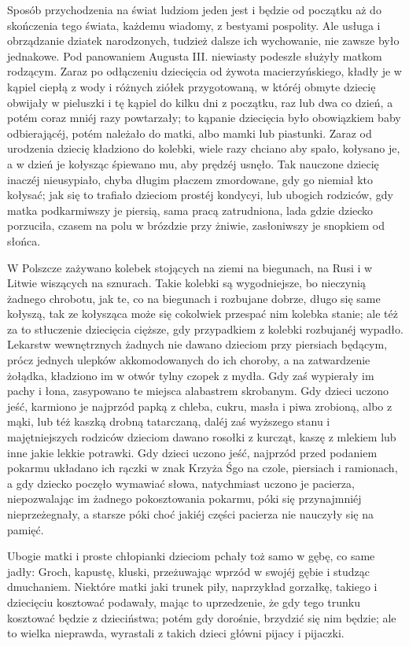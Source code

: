\documentclass{book}
\begin{document}
Sposób przychodzenia na świat ludziom jeden jest i będzie od początku aż do skończenia tego świata, każdemu wiadomy, z bestyami pospolity. Ale usługa i obrządzanie dziatek narodzonych, tudzież dalsze ich wychowanie, nie zawsze było jednakowe. Pod panowaniem Augusta III. niewiasty podeszłe służyły matkom rodzącym. Zaraz po odłączeniu dziecięcia od żywota macierzyńskiego, kładły je w kąpiel ciepłą z wody i różnych ziółek przygotowaną, w któréj obmyte dziecię obwijały w pieluszki i tę kąpiel do kilku dni z początku, raz lub dwa co dzień, a potém coraz mniéj razy powtarzały; to kąpanie dziecięcia było obowiązkiem baby odbierającéj, potém należało do matki, albo mamki lub piastunki. Zaraz od urodzenia dziecię kładziono do kolebki, wiele razy chciano aby spało, kołysano je, a w dzień je kołysząc śpiewano mu, aby prędzéj usnęło. Tak nauczone dziecię inaczéj nieusypiało, chyba długim płaczem zmordowane, gdy go niemiał kto kołysać; jak się to trafiało dzieciom prostéj kondycyi, lub ubogich rodziców, gdy matka podkarmiwszy je piersią, sama pracą zatrudniona, lada gdzie dziecko porzuciła, czasem na polu w brózdzie przy żniwie, zasłoniwszy je snopkiem od słońca.

W Polszcze zażywano kolebek stojących na ziemi na biegunach, na Rusi i w Litwie wiszących na sznurach. Takie kolebki są wygodniejsze, bo nieczynią żadnego chrobotu, jak te, co na biegunach i rozbujane dobrze, długo się same kołyszą, tak ze kołysząca może się cokolwiek przespać nim kolebka stanie; ale téż za to stłuczenie dziecięcia cięższe, gdy przypadkiem z kolebki rozbujanéj wypadło. Lekarstw wewnętrznych żadnych nie dawano dzieciom przy piersiach będącym, prócz jednych ulepków akkomodowanych do ich choroby, a na zatwardzenie żołądka, kładziono im w otwór tylny czopek z mydła. Gdy zaś wypierały im pachy i łona, zasypowano te miejsca alabastrem skrobanym. Gdy dzieci uczono jeść, karmiono je najprzód papką z chleba, cukru, masła i piwa zrobioną, albo z mąki, lub téż kaszką drobną tatarczaną, daléj zaś wyższego stanu i majętniejszych rodziców dzieciom dawano rosołki z kurcząt, kaszę z mlekiem lub inne jakie lekkie potrawki. Gdy dzieci uczono jeść, najprzód przed podaniem pokarmu układano ich rączki w znak Krzyża Śgo na czole, piersiach i ramionach, a gdy dziecko poczęło wymawiać słowa, natychmiast uczono je pacierza, niepozwalając im żadnego pokosztowania pokarmu, póki się przynajmniéj nieprzeżegnały, a starsze póki choć jakiéj części pacierza nie nauczyły się na pamięć.

Ubogie matki i proste chłopianki dzieciom pchały toż samo w gębę, co same jadły: Groch, kapustę, kluski, przeżuwając wprzód w swojéj gębie i studząc dmuchaniem. Niektóre matki jaki trunek piły, naprzykład gorzałkę, takiego i dziecięciu kosztować podawały, mając to uprzedzenie, że gdy tego trunku kosztować będzie z dzieciństwa; potém gdy dorośnie, brzydzić się nim będzie; ale to wielka nieprawda, wyrastali z takich dzieci główni pijacy i pijaczki.
\end{document}
